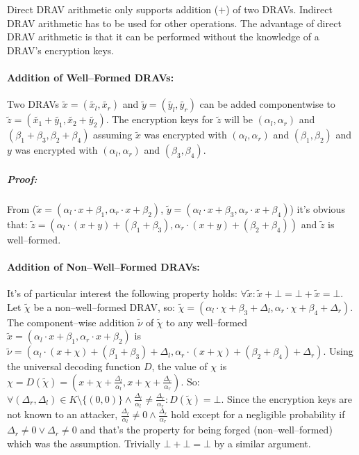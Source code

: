 \label{sec:direct-DRAV-arithmetic}

Direct DRAV arithmetic only supports addition ($+$) of two DRAVs. Indirect DRAV
arithmetic has to be used for other operations. The advantage of direct DRAV
arithmetic is that it can be performed without the knowledge of a DRAV's
encryption keys.

\paragraph{Addition of Well--Formed DRAVs:} Two DRAVs $\widetilde{x} =
(\widetilde{x_l}, \widetilde{x_r})$ and $\widetilde{y} = (\widetilde{y_l},
\widetilde{y_r})$ can be added componentwise to $\widetilde{z} =
\left(\widetilde{x_1} + \widetilde{y_1}, \widetilde{x_2} +
\widetilde{y_2}\right)$. The encryption keys for $\widetilde{z}$ will be
$(\alpha_l, \alpha_r)$ and $(\beta_1 + \beta_3, \beta_2 + \beta_4)$ assuming
$\widetilde{x}$ was encrypted with $(\alpha_l, \alpha_r)$ and $(\beta_1,
\beta_2)$ and $y$ was encrypted with $(\alpha_l, \alpha_r)$ and $(\beta_3,
\beta_4)$.

\subparagraph{Proof:} From ($\widetilde{x} = \left(\alpha_l \cdot x + \beta_1,
\alpha_r \cdot x + \beta_2\right)$, $\widetilde{y} = \left(\alpha_l \cdot x +
\beta_3, \alpha_r \cdot x + \beta_4\right)$) it's obvious that: $\widetilde{z} =
\left(\alpha_l \cdot (x+y) + (\beta_1 + \beta_3), \alpha_r \cdot (x+y) +
(\beta_2 + \beta_4)\right)$ and $\widetilde{z}$ is well--formed.

\paragraph{Addition of Non--Well--Formed DRAVs:} It's of particular interest the
following property holds: $\forall \widetilde{x}: \widetilde{x} + \bot = \bot
+ \widetilde{x} = \bot$. Let $\widetilde{\chi}$ be a non--well--formed DRAV,
so: $\widetilde{\chi} = (\alpha_l \cdot \chi + \beta_3 + \Delta_l, \alpha_r
\cdot \chi + \beta_4 + \Delta_r)$. The component--wise addition
$\widetilde{\nu}$ of $\widetilde{\chi}$ to any well--formed $\widetilde{x} =
(\alpha_l \cdot x + \beta_1, \alpha_r \cdot x + \beta_2)$ is $\widetilde{\nu} =
(\alpha_l \cdot (x+\chi) + (\beta_1+\beta_3) + \Delta_l, \alpha_r \cdot (x+\chi)
+ (\beta_2+\beta_4) + \Delta_r)$. Using the universal decoding function $D$, the
value of $\chi$ is $\chi = D(\widetilde{\chi}) = (x + \chi +
\frac{\Delta_l}{\alpha_l}, x + \chi + \frac{\Delta_r}{\alpha_r})$. So: $\forall
(\Delta_r, \Delta_l) \in K \setminus \{(0, 0)\} \wedge \frac{\Delta_l}{\alpha_l}
\neq \frac{\Delta_r}{\alpha_r}: D(\widetilde{\chi}) = \bot$. Since the
encryption keys are not known to an attacker, $\frac{\Delta_l}{\alpha_l} \neq 0
\wedge \frac{\Delta_r}{\alpha_r}$ hold except for a negligible probability if
$\Delta_r \neq 0 \vee \Delta_r \neq 0$ and that's the property for being forged
(non--well--formed) which was the assumption. Trivially $\bot + \bot = \bot$ by
a similar argument.


